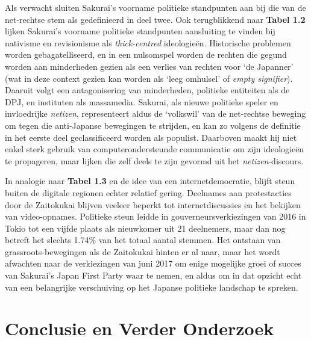 \documentclass[10.5pt,dutch,]{article}
\begin{document}
Als verwacht sluiten Sakurai's voorname politieke standpunten aan bij
die van de net-rechtse stem als gedefinieerd in deel twee. Ook
terugblikkend naar \textbf{Tabel 1.2} lijken Sakurai's voorname
politieke standpunten aansluiting te vinden bij nativisme en
revisionisme als \emph{thick-centred} ideologieën. Historische problemen
worden gebagatelliseerd, en in een nulsomspel worden de rechten die
gegund worden aan minderheden gezien als een verlies van rechten voor
`de Japanner' (wat in deze context gezien kan worden als `leeg omhulsel'
of \emph{empty signifier}). Daaruit volgt een antagonisering van
minderheden, politieke entiteiten als de DPJ, en instituten als
massamedia. Sakurai, als nieuwe politieke speler en invloedrijke
\emph{netizen}, representeert aldus de `volkswil' van de net-rechtse
beweging om tegen die anti-Japanse bewegingen te strijden, en kan zo
volgens de definitie in het eerste deel geclassificeerd worden als
populist. Daarboven maakt hij niet enkel sterk gebruik van
computerondersteunde communicatie om zijn ideologieën te propageren,
maar lijken die zelf deels te zijn gevormd uit het
\emph{netizen}-discours.

In analogie naar \textbf{Tabel 1.3} en de idee van een
internetdemocratie, blijft steun buiten de digitale regionen echter
relatief gering. Deelnames aan protestacties door de Zaitokukai blijven
veeleer beperkt tot internetdiscussies en het bekijken van
video-opnames. Politieke steun leidde in gouverneursverkiezingen van
2016 in Tokio tot een vijfde plaats als nieuwkomer uit 21 deelnemers,
maar dan nog betreft het slechts 1.74\% van het totaal aantal stemmen.
Het ontstaan van grassroots-bewegingen als de Zaitokukai hinten er al naar, maar het wordt afwachten naar de verkiezingen van juni 2017 om enige
mogelijke groei of succes van Sakurai's Japan First Party waar te nemen, en aldus om in dat opzicht echt
van een belangrijke verschuiving op het Japanse politieke landschap te spreken.

\newpage

\section{Conclusie en Verder
Onderzoek}\label{conclusie-en-verder-onderzoek}
\end{document}
